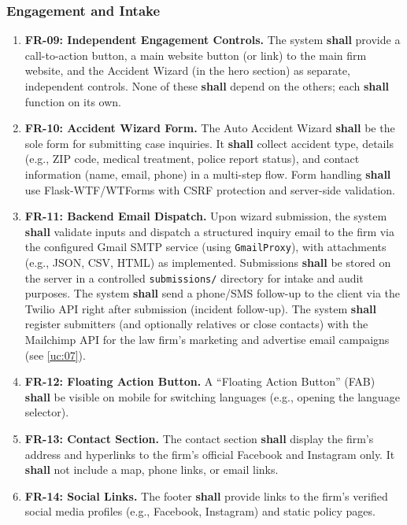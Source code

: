 \documentclass{article}
\begin{document}
\subsubsection{Engagement and Intake}
\begin{enumerate}
  \item \textbf{FR-09: Independent Engagement Controls.} The system \textbf{shall} provide a call-to-action button, a main website button (or link) to the main firm website, and the Accident Wizard (in the hero section) as separate, independent controls. None of these \textbf{shall} depend on the others; each \textbf{shall} function on its own.
  \item \label{fr:10} \textbf{FR-10: Accident Wizard Form.} The Auto Accident Wizard \textbf{shall} be the sole form for submitting case inquiries. It \textbf{shall} collect accident type, details (e.g., ZIP code, medical treatment, police report status), and contact information (name, email, phone) in a multi-step flow. Form handling \textbf{shall} use Flask-WTF/WTForms with CSRF protection and server-side validation.
  \item \textbf{FR-11: Backend Email Dispatch.} Upon wizard submission, the system \textbf{shall} validate inputs and dispatch a structured inquiry email to the firm via the configured Gmail SMTP service (using \texttt{GmailProxy}), with attachments (e.g., JSON, CSV, HTML) as implemented. Submissions \textbf{shall} be stored on the server in a controlled \texttt{submissions/} directory for intake and audit purposes. The system \textbf{shall} send a phone/SMS follow-up to the client via the Twilio API right after submission (incident follow-up). The system \textbf{shall} register submitters (and optionally relatives or close contacts) with the Mailchimp API for the law firm's marketing and advertise email campaigns (see \ref{uc:07}).
  \item \textbf{FR-12: Floating Action Button.} A ``Floating Action Button'' (FAB) \textbf{shall} be visible on mobile for switching languages (e.g., opening the language selector).
  \item \label{fr:13} \textbf{FR-13: Contact Section.} The contact section \textbf{shall} display the firm's address and hyperlinks to the firm's official Facebook and Instagram only. It \textbf{shall} not include a map, phone links, or email links.
  \item \textbf{FR-14: Social Links.} The footer \textbf{shall} provide links to the firm's verified social media profiles (e.g., Facebook, Instagram) and static policy pages.
\end{enumerate}
\end{document}
